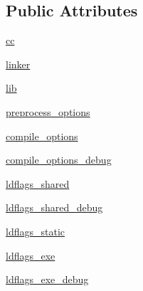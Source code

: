 \subsection*{Public Attributes}
\begin{DoxyCompactItemize}
\item 
\hyperlink{classsetuptools_1_1__distutils_1_1bcppcompiler_1_1BCPPCompiler_a979d780bad22097ec9219617d71039c3}{cc}
\item 
\hyperlink{classsetuptools_1_1__distutils_1_1bcppcompiler_1_1BCPPCompiler_a39558b41723e0f99a613b8c7d3b24cf8}{linker}
\item 
\hyperlink{classsetuptools_1_1__distutils_1_1bcppcompiler_1_1BCPPCompiler_ae4bdf2778f179247adbe644216677681}{lib}
\item 
\hyperlink{classsetuptools_1_1__distutils_1_1bcppcompiler_1_1BCPPCompiler_a5849e6bb432bc5e4cfa1235cf83295a4}{preprocess\+\_\+options}
\item 
\hyperlink{classsetuptools_1_1__distutils_1_1bcppcompiler_1_1BCPPCompiler_aa291302def980c0dab9ea30dd1269784}{compile\+\_\+options}
\item 
\hyperlink{classsetuptools_1_1__distutils_1_1bcppcompiler_1_1BCPPCompiler_a48a56104a01160f1a8f694016e2cdcc3}{compile\+\_\+options\+\_\+debug}
\item 
\hyperlink{classsetuptools_1_1__distutils_1_1bcppcompiler_1_1BCPPCompiler_a56d6d865183dc42da76a71e53cae57b4}{ldflags\+\_\+shared}
\item 
\hyperlink{classsetuptools_1_1__distutils_1_1bcppcompiler_1_1BCPPCompiler_a13bf7a32c54b182ba0232595742c2b4c}{ldflags\+\_\+shared\+\_\+debug}
\item 
\hyperlink{classsetuptools_1_1__distutils_1_1bcppcompiler_1_1BCPPCompiler_aa3b0af36fbbe8d72b0068f89978d51fb}{ldflags\+\_\+static}
\item 
\hyperlink{classsetuptools_1_1__distutils_1_1bcppcompiler_1_1BCPPCompiler_ad9d7953921f5a813059fe17c5ae1c413}{ldflags\+\_\+exe}
\item 
\hyperlink{classsetuptools_1_1__distutils_1_1bcppcompiler_1_1BCPPCompiler_a128e52975fc1f29a5c5d78b2079aacd3}{ldflags\+\_\+exe\+\_\+debug}
\end{DoxyCompactItemize}
